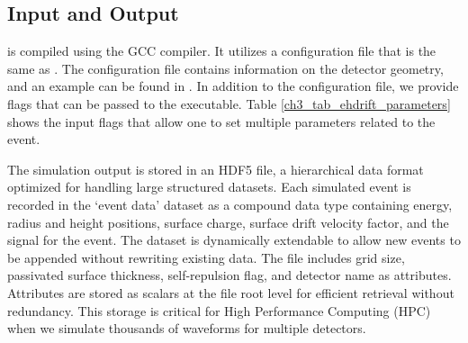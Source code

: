 \subsection{Input and Output}
{\ehd} is compiled using the GCC compiler. It utilizes a configuration file that is the same as {\siggen}. The configuration file contains information on the detector geometry, and an example can be found in \cite{ehdrift2024}. In addition to the configuration file, we provide flags that can be passed to the executable. Table \ref{ch3_tab_ehdrift_parameters} shows the input flags that allow one to set multiple parameters related to the event.



The simulation output is stored in an HDF5 file, a hierarchical data format optimized for handling large structured datasets. Each simulated event is recorded in the `event data' dataset as a compound data type containing energy, radius and height positions, surface charge, surface drift velocity factor, and the signal for the event. The dataset is dynamically extendable to allow new events to be appended without rewriting existing data. The file includes grid size, passivated surface thickness, self-repulsion flag, and detector name as attributes. Attributes are stored as scalars at the file root level for efficient retrieval without redundancy. This storage is critical for High Performance Computing (HPC) when we simulate thousands of waveforms for multiple detectors.